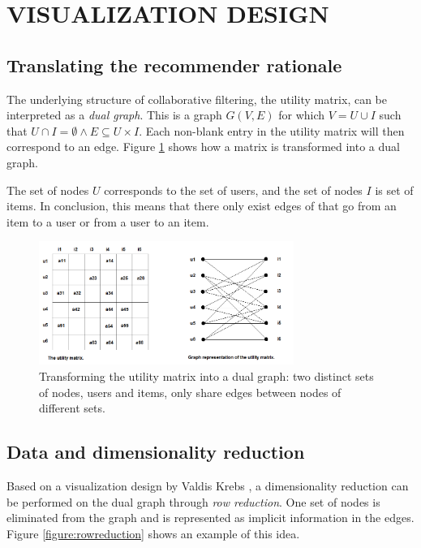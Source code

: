 \documentclass[a4paper,10pt,twocolumn]{article}
\begin{document}
\section{VISUALIZATION DESIGN}\label{section:design}


\subsection{Translating the recommender rationale}\label{section:design:subsection:rationale}

The underlying structure of collaborative filtering, the utility matrix, can be interpreted as a \emph{dual graph}. This is a graph $G(V,E)$ for which $V = U \cup I$ such that $U \cap I = \emptyset \wedge E \subseteq U \times I$\cite{dekimpe:2007}. Each non-blank entry in the utility matrix will then correspond to an edge. Figure \ref{figure:dualgraph} shows how a matrix is transformed into a dual graph.

The set of nodes $U$ corresponds to the set of users, and the set of nodes $I$ is set of items. In conclusion, this means that there only exist edges of that go from an item to a user or from a user to an item.

\begin{figure}
	\includegraphics[width=8.3cm]{img/dualgraph}
	\caption{Transforming the utility matrix into a dual graph: two distinct sets of nodes, users and items, only share edges between nodes of different sets.}
	\label{figure:dualgraph}
\end{figure}


\subsection{Data and dimensionality reduction}\label{section:design:subsection:reduction}

Based on a visualization design by Valdis Krebs \cite{steele:2010}, a dimensionality reduction can be performed on the dual graph through \emph{row reduction}. One set of nodes is eliminated from the graph and is represented as implicit information in the edges. Figure \ref{figure:rowreduction} shows an example of this idea.
\end{document}

